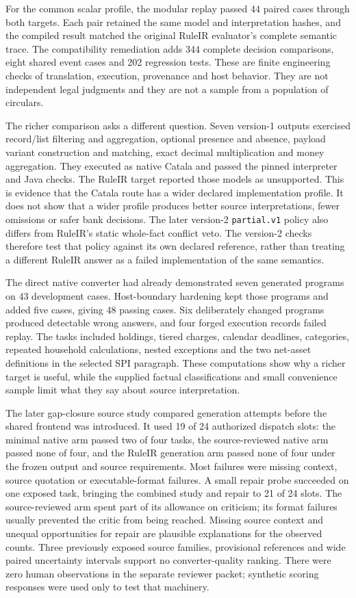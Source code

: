 \documentclass[12pt,a4paper,oneside,openany]{book}
\begin{document}
For the common scalar profile, the modular replay passed 44 paired cases through
both targets. Each pair retained the same model and interpretation hashes, and
the compiled result matched the original RuleIR evaluator's complete semantic
trace. The compatibility remediation adds 344 complete decision comparisons,
eight shared event cases and 202 regression tests. These are finite engineering
checks of translation, execution, provenance and host behavior. They are not
independent legal judgments and they are not a sample from a population of
circulars.

The richer comparison asks a different question. Seven version-1 outputs
exercised record/list filtering and aggregation, optional presence and absence,
payload variant construction and matching, exact decimal multiplication and
money aggregation. They executed as native Catala and passed the pinned
interpreter and Java checks. The RuleIR target reported those models
as unsupported. This is evidence that the Catala route has a wider declared
implementation profile. It does not show that a wider profile produces better
source interpretations, fewer omissions or safer bank decisions. The
later version-2 \texttt{partial.v1} policy also differs from RuleIR's static
whole-fact conflict veto. The version-2 checks therefore test that policy
against its own declared reference, rather than treating a different RuleIR
answer as a failed implementation of the same semantics.

The direct native converter had already demonstrated seven generated programs
on 43 development cases. Host-boundary hardening kept those programs and added
five cases, giving 48 passing cases. Six deliberately changed programs produced
detectable wrong answers, and four forged execution records failed replay.
The tasks included holdings, tiered charges, calendar deadlines, categories,
repeated household calculations, nested exceptions and the two net-asset
definitions in the selected SPI paragraph. These computations show why a
richer target is useful, while the supplied factual classifications and small
convenience sample limit what they say about source interpretation.

The later gap-closure source study compared generation attempts before the
shared frontend was introduced. It used 19 of 24 authorized dispatch slots:
the minimal native arm passed two of four tasks, the source-reviewed native arm
passed none of four, and the RuleIR generation arm passed none of four under
the frozen output and source requirements. Most failures were missing context,
source quotation or executable-format failures. A small repair probe succeeded
on one exposed task, bringing the combined study and repair to 21 of 24 slots.
The source-reviewed arm spent part of its allowance on criticism; its format
failures usually prevented the critic from being reached. Missing source
context and unequal opportunities for repair are plausible explanations for
the observed counts. Three previously exposed source families, provisional
references and wide paired uncertainty intervals support no converter-quality
ranking. There were zero human observations in the separate reviewer packet;
synthetic scoring responses were used only to test that machinery.
\end{document}
